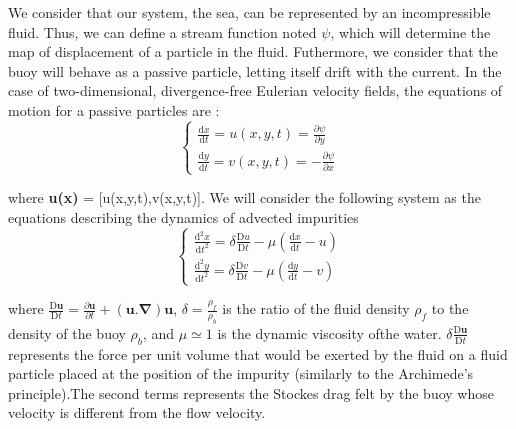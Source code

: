 \documentclass[a4paper]{report}
\begin{document}
We consider that our system, the sea, can be represented by an incompressible fluid. Thus, we can define a stream function noted $\psi$, which will determine the map of displacement of a particle in the fluid.
Futhermore, we consider that the buoy will behave as a passive particle, letting itself drift with the current.
In the case of two-dimensional, divergence-free Eulerian velocity fields, the equations of motion for a passive particles are : \begin{equation}
\left\{\begin{matrix}
\frac{\mathrm{d} x}{\mathrm{d} t}= u(x,y,t)=\frac{\partial \psi }{\partial y}\\ 
\frac{\mathrm{d} y}{\mathrm{d} t}= v(x,y,t)=-\frac{\partial \psi }{\partial x}
\end{matrix}\right.
\end{equation}

where \textbf{u(x)} = [u(x,y,t),v(x,y,t)].
We will consider the following system as the equations describing the dynamics of advected impurities
\begin{equation}
\left\{\begin{matrix}
\frac{\mathrm{d^2} x}{\mathrm{d} t^2}= \delta \frac{\mathrm{D} u}{\mathrm{D} t} -\mu (\frac{\mathrm{d} x }{\mathrm{d} t}-u)\\ 
\frac{\mathrm{d^2} y}{\mathrm{d} t^2}= \delta \frac{\mathrm{D} v}{\mathrm{D} t} -\mu (\frac{\mathrm{d} y}{\mathrm{d} t}-v)
\end{matrix}\right.
\end{equation}

where 
$
\frac{\mathrm{D} \mathbf{u}}{\mathrm{D} t} = \frac{\partial \mathbf{u} }{\partial t}+\mathbf{(u. \nabla )u}
$,
$\delta = \frac{\rho_f}{\rho_b}$
is the ratio of the fluid density $\rho_f$ to the density of the buoy $\rho_b$, and
$\mu \simeq 1$ is the dynamic viscosity ofthe water.
$\delta \frac{\mathrm{D} \mathbf{u}}{\mathrm{D} t}$ represents the force per unit volume that would be exerted by the fluid on a fluid particle placed at the position of the impurity (similarly to the Archimede's principle).The second terms represents the Stockes drag felt by the buoy whose velocity is different from the flow velocity.\\
\end{document}
